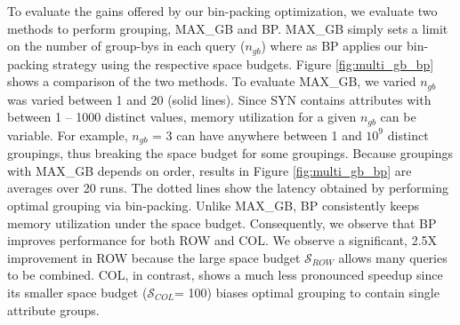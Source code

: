 
To evaluate the gains offered by our bin-packing optimization, we evaluate two methods to
perform grouping, MAX\_GB and BP.
MAX\_GB simply sets a limit on the number of group-bys in each query ($n_{gb}$) where as BP applies
our bin-packing strategy using the respective space budgets.
Figure \ref{fig:multi_gb_bp} shows a comparison of the two methods.
To evaluate MAX\_GB, we varied $n_{gb}$ was varied between 1 and 20 (solid lines). 
Since SYN contains attributes with between 1 -- 1000 distinct values, memory utilization for a given
$n_{gb}$ can be variable.
For example, $n_{gb}$ = 3 can have anywhere between 1 and $10^9$ distinct groupings, thus breaking the
space budget for some groupings. 
Because groupings with MAX\_GB depends on order, results in Figure \ref{fig:multi_gb_bp} are averages
over 20 runs.
The dotted lines show the latency obtained by performing optimal grouping via bin-packing.
Unlike MAX\_GB, BP consistently keeps memory utilization under the space budget.
Consequently, we observe that BP improves performance for both ROW and COL. 
We observe a significant, 2.5X improvement in ROW because the large space budget $\mathcal{S}_{ROW}$
allows many queries to be combined.
COL, in contrast, shows a much less pronounced speedup since its smaller space budget ($\mathcal{S}_{COL}$= 100) 
biases optimal grouping to contain single attribute groups.


